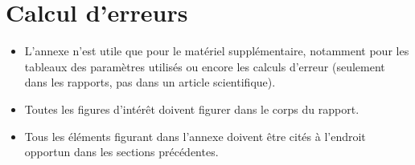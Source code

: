 \section{Calcul d'erreurs}

\begin{itemize}
\item L'annexe n'est utile que pour le matériel supplémentaire, notamment pour les tableaux des paramètres utilisés ou encore les calculs d'erreur (seulement dans les rapports, pas dans un article scientifique).
\item Toutes les figures d'intérêt doivent figurer dans le corps du rapport.
\item Tous les éléments figurant dans l'annexe doivent être cités à l'endroit opportun dans les sections précédentes.
\end{itemize}

